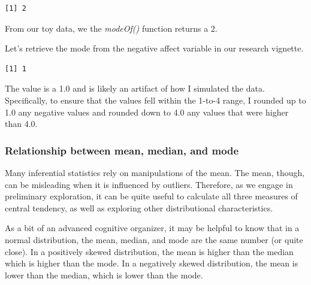 \documentclass[
  11pt,
]{book}
\newenvironment{Shaded}{\begin{snugshade}}{\end{snugshade}}
\newcommand{\AttributeTok}[1]{\textcolor[rgb]{0.27,0.27,0.27}{#1}}
\newcommand{\ConstantTok}[1]{\textcolor[rgb]{0.37,0.37,0.37}{#1}}
\newcommand{\FunctionTok}[1]{\textcolor[rgb]{0.27,0.27,0.27}{\textbf{#1}}}
\newcommand{\NormalTok}[1]{#1}
\newcommand{\SpecialCharTok}[1]{\textcolor[rgb]{0.43,0.43,0.43}{\textbf{#1}}}
\begin{document}
\begin{verbatim}
[1] 2
\end{verbatim}

From our toy data, we the \emph{modeOf()} function returns a 2.

Let's retrieve the mode from the negative affect variable in our research vignette.

\begin{Shaded}
\end{Shaded}

\begin{verbatim}
[1] 1
\end{verbatim}

The value is a 1.0 and is likely an artifact of how I simulated the data. Specifically, to ensure that the values fell within the 1-to-4 range, I rounded up to 1.0 any negative values and rounded down to 4.0 any values that were higher than 4.0.

\hypertarget{relationship-between-mean-median-and-mode}{%
\subsubsection{Relationship between mean, median, and mode}\label{relationship-between-mean-median-and-mode}}

Many inferential statistics rely on manipulations of the mean. The mean, though, can be misleading when it is influenced by outliers. Therefore, as we engage in preliminary exploration, it can be quite useful to calculate all three measures of central tendency, as well as exploring other distributional characteristics.

As a bit of an advanced cognitive organizer, it may be helpful to know that in a normal distribution, the mean, median, and mode are the same number (or quite close). In a positively skewed distribution, the mean is higher than the median which is higher than the mode. In a negatively skewed distribution, the mean is lower than the median, which is lower than the mode.

\begin{Shaded}
\end{Shaded}
\end{document}
